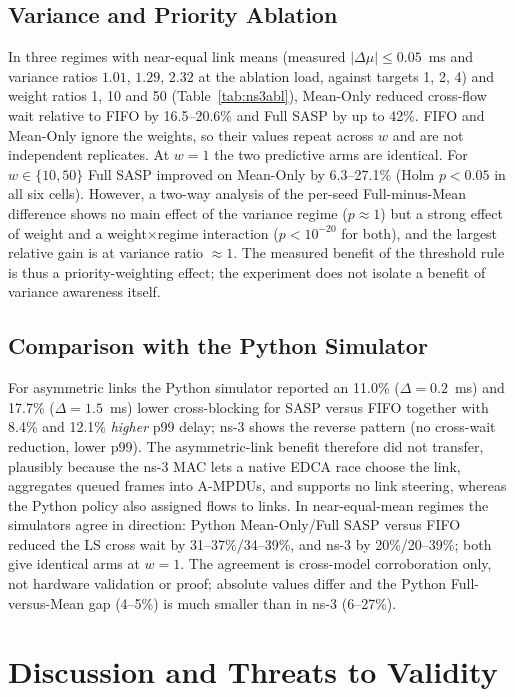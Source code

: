 \documentclass[10pt,journal,compsoc]{IEEEtran}
\begin{document}
\subsection{Variance and Priority Ablation}
In three regimes with near-equal link means (measured $|\Delta\mu|\le 0.05$~ms and variance ratios $1.01$, $1.29$, $2.32$ at the ablation load, against targets 1, 2, 4) and weight ratios 1, 10 and 50 (Table~\ref{tab:ns3abl}), Mean-Only reduced cross-flow wait relative to FIFO by 16.5--20.6\% and Full SASP by up to 42\%. FIFO and Mean-Only ignore the weights, so their values repeat across $w$ and are not independent replicates. At $w=1$ the two predictive arms are identical. For $w\in\{10,50\}$ Full SASP improved on Mean-Only by 6.3--27.1\% (Holm $p<0.05$ in all six cells). However, a two-way analysis of the per-seed Full-minus-Mean difference shows no main effect of the variance regime ($p\approx 1$) but a strong effect of weight and a weight$\times$regime interaction ($p<10^{-20}$ for both), and the largest relative gain is at variance ratio $\approx 1$. The measured benefit of the threshold rule is thus a priority-weighting effect; the experiment does not isolate a benefit of variance awareness itself.

\subsection{Comparison with the Python Simulator}
For asymmetric links the Python simulator reported an 11.0\% ($\Delta=0.2$~ms) and 17.7\% ($\Delta=1.5$~ms) lower cross-blocking for SASP versus FIFO together with 8.4\% and 12.1\% \emph{higher} p99 delay; ns-3 shows the reverse pattern (no cross-wait reduction, lower p99). The asymmetric-link benefit therefore did not transfer, plausibly because the ns-3 MAC lets a native EDCA race choose the link, aggregates queued frames into A-MPDUs, and supports no link steering, whereas the Python policy also assigned flows to links. In near-equal-mean regimes the simulators agree in direction: Python Mean-Only/Full SASP versus FIFO reduced the LS cross wait by 31--37\%/34--39\%, and ns-3 by 20\%/20--39\%; both give identical arms at $w=1$. The agreement is cross-model corroboration only, not hardware validation or proof; absolute values differ and the Python Full-versus-Mean gap (4--5\%) is much smaller than in ns-3 (6--27\%).

\section{Discussion and Threats to Validity}
\label{sec:discussion}
\end{document}
